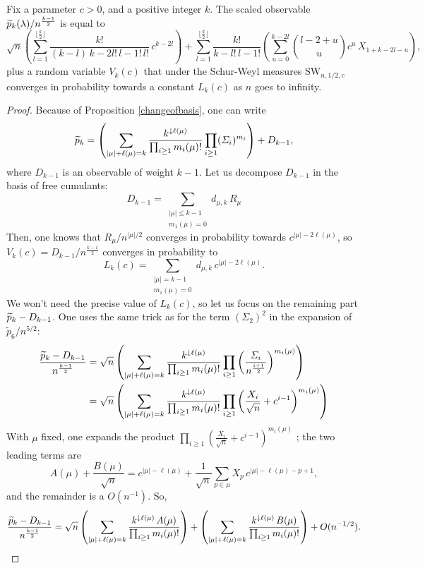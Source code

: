 \documentclass[10pt]{amsart}
\begin{document}
\begin{lemma}\label{nasty}
Fix a parameter $c>0$, and a positive integer $k$. The scaled observable $\widetilde{p}_{k}(\lambda)/n^{\frac{k-1}{2}}$ is equal to
$$\sqrt{n}\left(\sum_{l=1}^{\lfloor \frac{k}{2}\rfloor} \frac{k!}{(k-l)\,k-2l!\,l-1!\,l!}\,c^{k-2l }\right)+\sum_{l=1}^{\lfloor \frac{k}{2}\rfloor}\frac{k!}{k-l!\,l-1!} \left( \sum_{u=0}^{k-2l} \binom{l-2+u}{u}c^{u}\,X_{1+k-2l-u} \right),$$
plus a random variable $V_{k}(c)$ that under the Schur-Weyl measures $\mathrm{SW}_{n,1/2,c}$ converges in probability towards a constant $L_{k}(c)$ as $n$ goes to infinity.
\end{lemma}
\begin{proof}
Because of Proposition \ref{changeofbasis}, one can write
$$\widetilde{p}_{k}=\left(\sum_{|\mu|+\ell(\mu)=k}\frac{k^{\downarrow \ell(\mu)}}{\prod_{i \geq 1}m_{i}(\mu)!} \prod_{i \geq 1}(\varSigma_{i})^{m_{i}}\right)+D_{k-1},$$
where $D_{k-1}$ is an observable of weight $k-1$. Let us decompose $D_{k-1}$ in the basis of free cumulants: 
$$D_{k-1}=\sum_{\substack{|\mu| \leq k-1\\ m_{1}(\mu)=0}}d_{\mu,k}\,R_{\mu}$$
Then, one knows that $R_{\mu}/n^{|\mu|/2}$ converges in probability towards $c^{|\mu|-2\ell(\mu)}$, so $V_{k}(c)=D_{k-1}/n^{\frac{k-1}{2}}$ converges in probability to
$$L_{k}(c)=\sum_{\substack{|\mu|=k-1  \\ m_{1}(\mu)=0}} d_{\mu,k}\,c^{|\mu|-2\ell(\mu)}.$$
We won't need the precise value of $L_{k}(c)$, so let us focus on the remaining part $\widetilde{p}_{k}-D_{k-1}$. One uses the same trick as for the term $(\varSigma_{2})^{2}$ in the expansion of $\widetilde{p}_{6}/n^{5/2}$:
\begin{align*}\frac{\widetilde{p}_{k}-D_{k-1}}{n^{\frac{k-1}{2}}}&=\sqrt{n}\left(\sum_{|\mu|+\ell(\mu)=k}\frac{k^{\downarrow \ell(\mu)}}{\prod_{i \geq 1}m_{i}(\mu)!} \prod_{i \geq 1}\left(\frac{\varSigma_{i}}{n^{\frac{i+1}{2}}}\right)^{m_{i}(\mu)}\right)\\
&=\sqrt{n}\left(\sum_{|\mu|+\ell(\mu)=k}\frac{k^{\downarrow \ell(\mu)}}{\prod_{i \geq 1}m_{i}(\mu)!} \prod_{i \geq 1}\left(\frac{X_{i}}{\sqrt{n}}+c^{i-1}\right)^{m_{i}(\mu)}\right)
\end{align*}
With $\mu$ fixed, one expands the product $\prod_{i\geq 1}\left(\frac{X_{i}}{\sqrt{n}}+c^{i-1}\right)^{m_{i}(\mu)}$ ; the two leading terms are
$$A(\mu)+\frac{B(\mu)}{\sqrt{n}}=c^{|\mu|-\ell(\mu)}+\frac{1}{\sqrt{n}}\sum_{p \in \mu} X_{p} \,c^{|\mu|-\ell(\mu)-p+1},$$
and the remainder is a $O(n^{-1})$. So,
$$\frac{\widetilde{p}_{k}-D_{k-1}}{n^{\frac{k-1}{2}}}=\sqrt{n}\left(\sum_{|\mu|+\ell(\mu)=k}\frac{k^{\downarrow \ell(\mu)}\,A(\mu)}{\prod_{i \geq 1}m_{i}(\mu)!}\right) + \left(\sum_{|\mu|+\ell(\mu)=k}\frac{k^{\downarrow \ell(\mu)}\,B(\mu) }{\prod_{i \geq 1}m_{i}(\mu)!}\right)+ O(n^{-1/2}).$$

\end{proof}
\end{document}
